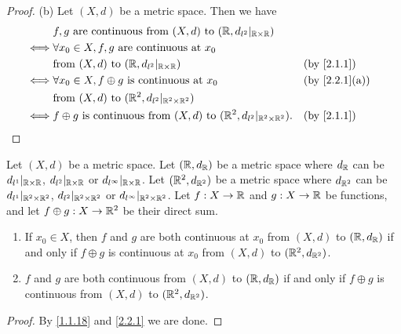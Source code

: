 \begin{proof}{(b)}
  Let \((X, d)\) be a metric space.
  Then we have
  \begin{align*}
         & f, g \text{ are continuous from } (X, d) \text{ to } (\R, d_{l^2}|_{\R \times \R})                                              \\
    \iff & \forall x_0 \in X, f, g \text{ are continuous at } x_0                                                                          \\
         & \text{from } (X, d) \text{ to } (\R, d_{l^2}|_{\R \times \R})                                  &  & \by{2.1.1}                  \\
    \iff & \forall x_0 \in X, f \oplus g \text{ is continuous at } x_0                                    &  & \text{(by \cref{2.2.1}(a))} \\
         & \text{from } (X, d) \text{ to } (\R^2, d_{l^2}|_{\R^2 \times \R^2})                                                             \\
    \iff & f \oplus g \text{ is continuous from } (X, d) \text{ to } (\R^2, d_{l^2}|_{\R^2 \times \R^2}). &  & \by{2.1.1}
  \end{align*}
\end{proof}

\begin{ac}\label{ac:2.2.1}
  Let \((X, d)\) be a metric space.
  Let \((\mathbb{R}, d_{\mathbb{R}})\) be a metric space where \(d_{\mathbb{R}}\) can be \(d_{l^1}|_{\mathbb{R} \times \mathbb{R}}\), \(d_{l^2}|_{\mathbb{R} \times \mathbb{R}}\) or \(d_{l^\infty}|_{\mathbb{R} \times \mathbb{R}}\).
  Let \((\mathbb{R}^2, d_{\mathbb{R}^2})\) be a metric space where \(d_{\mathbb{R}^2}\) can be \(d_{l^1}|_{\mathbb{R}^2 \times \mathbb{R}^2}\), \(d_{l^2}|_{\mathbb{R}^2 \times \mathbb{R}^2}\) or \(d_{l^\infty}|_{\mathbb{R}^2 \times \mathbb{R}^2}\).
  Let \(f : X \to \mathbb{R}\) and \(g : X \to \mathbb{R}\) be functions, and let \(f \oplus g : X \to \mathbb{R}^2\) be their direct sum.
  \begin{enumerate}
    \item If \(x_0 \in X\), then \(f\) and \(g\) are both continuous at \(x_0\) from \((X, d)\) to \((\mathbb{R}, d_{\mathbb{R}})\) if and only if \(f \oplus g\) is continuous at \(x_0\) from \((X, d)\) to \((\mathbb{R}^2, d_{\mathbb{R}^2})\).
    \item \(f\) and \(g\) are both continuous from \((X, d)\) to \((\mathbb{R}, d_{\mathbb{R}})\) if and only if \(f \oplus g\) is continuous from \((X, d)\) to \((\mathbb{R}^2, d_{\mathbb{R}^2})\).
  \end{enumerate}
\end{ac}

\begin{proof}
  By \cref{1.1.18} and \cref{2.2.1} we are done.
\end{proof}

